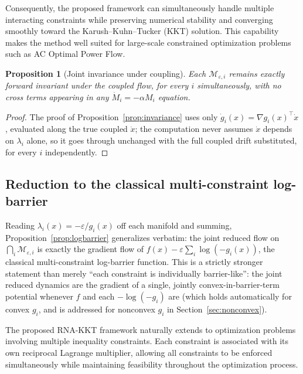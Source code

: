 \documentclass[11pt,onecolumn]{article}
\newtheorem{proposition}[theorem]{Proposition}
\theoremstyle{definition}
\theoremstyle{remark}
\begin{document}
Consequently, the proposed framework can simultaneously handle multiple interacting constraints while preserving numerical stability and converging smoothly toward the Karush--Kuhn--Tucker (KKT) solution. This capability makes the method well suited for large-scale constrained optimization problems such as AC Optimal Power Flow.







\begin{proposition}[Joint invariance under coupling]
Each $\mathcal{M}_{\varepsilon,i}$ remains exactly forward invariant under the coupled flow,
for every $i$ simultaneously, with no cross terms appearing in any $\dot M_i = -\alpha M_i$
equation.
\end{proposition}

\begin{proof}
The proof of Proposition~\ref{prop:invariance} uses only
$\dot g_i(x) = \nabla g_i(x)^\top \dot x$, evaluated along the true coupled $\dot x$; the
computation never assumes $\dot x$ depends on $\lambda_i$ alone, so it goes through unchanged
with the full coupled drift substituted, for every $i$ independently.
\end{proof}

\subsection{Reduction to the classical multi-constraint log-barrier}
Reading $\lambda_i(x) = -\varepsilon/g_i(x)$ off each manifold and summing,
Proposition~\ref{prop:logbarrier} generalizes verbatim: the joint reduced flow on
$\bigcap_i \mathcal{M}_{\varepsilon,i}$ is exactly the gradient flow of
$f(x) - \varepsilon \sum_i \log(-g_i(x))$, the classical multi-constraint log-barrier function.
This is a strictly stronger statement than merely ``each constraint is individually
barrier-like'': the joint reduced dynamics are the gradient of a single, jointly
convex-in-barrier-term potential whenever $f$ and each $-\log(-g_i)$ are (which holds
automatically for convex $g_i$, and is addressed for nonconvex $g_i$ in
Section~\ref{sec:nonconvex}).

The proposed RNA-KKT framework naturally extends to optimization problems involving multiple inequality constraints. Each constraint is associated with its own reciprocal Lagrange multiplier, allowing all constraints to be enforced simultaneously while maintaining feasibility throughout the optimization process.
\end{document}
